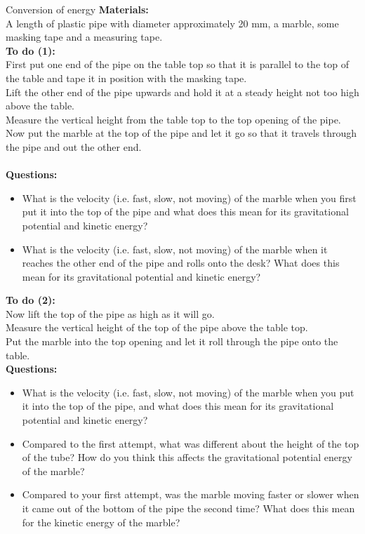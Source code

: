 \begin{activity}{Conversion of energy}
\textbf{Materials:}\\
A length of plastic pipe with diameter approximately 20 mm, a marble, some masking tape and a measuring tape. \\
\textbf{To do (1):}\\
First put one end of the pipe on the table top so that it is parallel to the top of the table and tape it in position with the masking tape. \\
Lift the other end of the pipe upwards and hold it at a steady height not too high above the table. \\
Measure the vertical height from the table top to the top opening of the pipe. \\
Now put the marble at the top of the pipe and let it go so that it travels through the pipe and out the other end. \\ \\
\textbf{Questions:}\\ 
\begin{itemize}
\item What is the velocity (i.e. fast, slow, not moving) of the marble when you first put it into the top of the pipe and what does this mean for its gravitational potential and kinetic energy? 
\item What is the velocity (i.e. fast, slow, not moving) of the marble when it reaches the other end of the pipe and rolls onto the desk? What does this mean for its gravitational potential and kinetic energy?
\end{itemize}

\textbf{To do (2):}\\
Now lift the top of the pipe as high as it will go. \\
Measure the vertical height of the top of the pipe above the table top. \\
Put the marble into the top opening and let it roll through the pipe onto the table.\\
\textbf{Questions:}\\ 
\begin{itemize}
\item What is the velocity (i.e. fast, slow, not moving) of the marble when you put it into the top of the pipe, and what does this mean for its gravitational potential and kinetic energy?
\item Compared to the first attempt, what was different about the height of the top of the tube? How do you think this affects the gravitational potential energy of the marble?
\item Compared to your first attempt, was the marble moving faster or slower when it came out of the bottom of the pipe the second time? What does this mean for the kinetic energy of the marble?
\end{itemize}
\end{activity}

